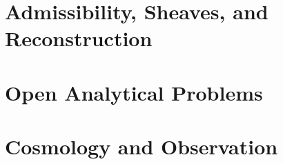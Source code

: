 \documentclass[12pt,openany]{book}
\begin{document}
\part{Admissibility, Sheaves, and Reconstruction}











\part{Open Analytical Problems}



\part{Cosmology and Observation}










\backmatter








\end{document}
